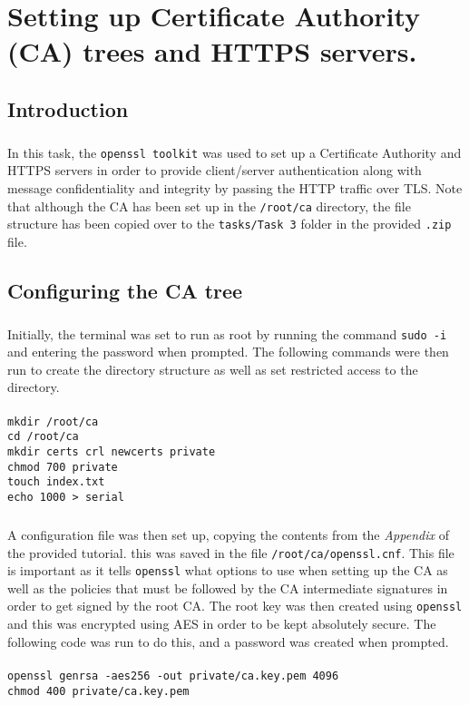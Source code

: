 \chapter{Setting up Certificate Authority (CA) trees and HTTPS servers.}
\section{Introduction}
\paragraph{ }In this task, the \texttt{openssl toolkit} was used to set up a Certificate Authority and HTTPS servers in order to provide client/server authentication along with message confidentiality and integrity by passing the HTTP traffic over TLS. Note that although the CA has been set up in the \texttt{/root/ca} directory, the file structure has been copied over to the \texttt{tasks/Task 3} folder in the provided \texttt{.zip} file.

\section{Configuring the CA tree}
\paragraph{ }Initially, the terminal was set to run as root by running the command \texttt{sudo -i} and entering the password when prompted. The following commands were then run to create the directory structure as well as set restricted access to the directory. \\
\vspace{0pt}\\
\texttt{mkdir /root/ca\\
cd /root/ca\\
mkdir certs crl newcerts private\\
chmod 700 private\\
touch index.txt\\
echo 1000 > serial}

\paragraph{ }A configuration file was then set up, copying the contents from the \textit{Appendix} of the provided tutorial. this was saved in the file \texttt{/root/ca/openssl.cnf}. This file is important as it tells \texttt{openssl} what options to use when setting up the CA as well as the policies that must be followed by the CA intermediate signatures in order to get signed by the root CA. The root key was then created using \texttt{openssl} and this was encrypted using AES in order to be kept absolutely secure. The following code was run to do this, and a password was created when prompted.\\
\vspace{0pt}\\
\texttt{openssl genrsa -aes256 -out private/ca.key.pem 4096\\
chmod 400 private/ca.key.pem}

